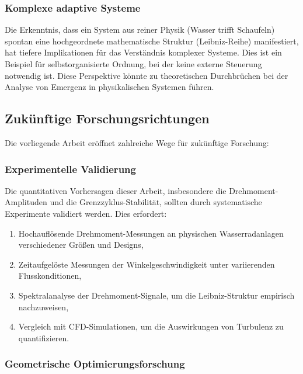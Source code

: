 \documentclass[a4paper,12pt]{article}
\theoremstyle{definition}
\begin{document}
\subsubsection*{Komplexe adaptive Systeme}

Die Erkenntnis, dass ein System aus reiner Physik (Wasser trifft Schaufeln) spontan eine hochgeordnete mathematische Struktur (Leibniz-Reihe) manifestiert, hat tiefere Implikationen für das Verständnis komplexer Systeme. Dies ist ein Beispiel für selbstorganisierte Ordnung, bei der keine externe Steuerung notwendig ist. Diese Perspektive könnte zu theoretischen Durchbrüchen bei der Analyse von Emergenz in physikalischen Systemen führen.

\subsection{Zukünftige Forschungsrichtungen}

Die vorliegende Arbeit eröffnet zahlreiche Wege für zukünftige Forschung:

\subsubsection*{Experimentelle Validierung}

Die quantitativen Vorhersagen dieser Arbeit, insbesondere die Drehmoment-Amplituden und die Grenzzyklus-Stabilität, sollten durch systematische Experimente validiert werden. Dies erfordert:
\begin{enumerate}
  \item Hochauflösende Drehmoment-Messungen an physischen Wasserradanlagen verschiedener Größen und Designs,
  \item Zeitaufgelöste Messungen der Winkelgeschwindigkeit unter variierenden Flusskonditionen,
  \item Spektralanalyse der Drehmoment-Signale, um die Leibniz-Struktur empirisch nachzuweisen,
  \item Vergleich mit CFD-Simulationen, um die Auswirkungen von Turbulenz zu quantifizieren.
\end{enumerate}

\subsubsection*{Geometrische Optimierungsforschung}
\end{document}
